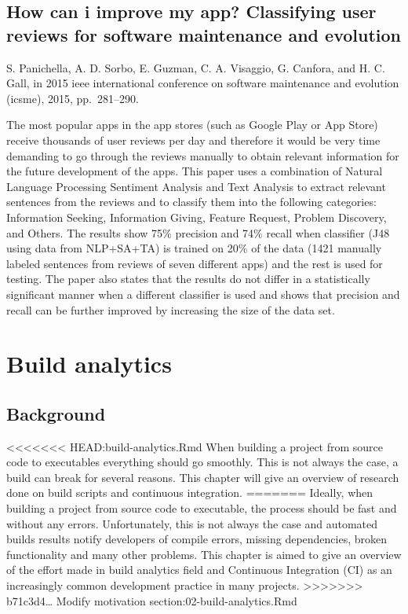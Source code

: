 \documentclass[]{book}
\begin{document}
\section{How can i improve my app? Classifying user reviews for software
maintenance and
evolution}\label{how-can-i-improve-my-app-classifying-user-reviews-for-software-maintenance-and-evolution}

S. Panichella, A. D. Sorbo, E. Guzman, C. A. Visaggio, G. Canfora, and
H. C. Gall, in 2015 ieee international conference on software
maintenance and evolution (icsme), 2015, pp.~281--290.

The most popular apps in the app stores (such as Google Play or App
Store) receive thousands of user reviews per day and therefore it would
be very time demanding to go through the reviews manually to obtain
relevant information for the future development of the apps. This paper
uses a combination of Natural Language Processing Sentiment Analysis and
Text Analysis to extract relevant sentences from the reviews and to
classify them into the following categories: Information Seeking,
Information Giving, Feature Request, Problem Discovery, and Others. The
results show 75\% precision and 74\% recall when classifier (J48 using
data from NLP+SA+TA) is trained on 20\% of the data (1421 manually
labeled sentences from reviews of seven different apps) and the rest is
used for testing. The paper also states that the results do not differ
in a statistically significant manner when a different classifier is
used and shows that precision and recall can be further improved by
increasing the size of the data set.

\chapter{Build analytics}\label{build-analytics}

\section{Background}\label{background}

\textless{}\textless{}\textless{}\textless{}\textless{}\textless{}\textless{}
HEAD:build-analytics.Rmd When building a project from source code to
executables everything should go smoothly. This is not always the case,
a build can break for several reasons. This chapter will give an
overview of research done on build scripts and continuous integration.
======= Ideally, when building a project from source code to executable,
the process should be fast and without any errors. Unfortunately, this
is not always the case and automated builds results notify developers of
compile errors, missing dependencies, broken functionality and many
other problems. This chapter is aimed to give an overview of the effort
made in build analytics field and Continuous Integration (CI) as an
increasingly common development practice in many projects.
\textgreater{}\textgreater{}\textgreater{}\textgreater{}\textgreater{}\textgreater{}\textgreater{}
b71c3d4\ldots{} Modify motivation section:02-build-analytics.Rmd
\end{document}
